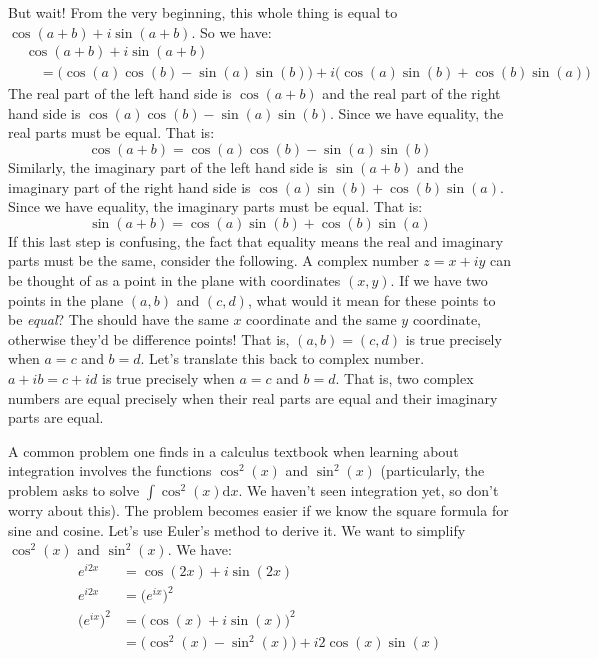 \documentclass{article}
\theoremstyle{normal}
\theoremstyle{plain}
\begin{document}
    But wait! From the very beginning, this whole thing is equal to
    $\cos(a+b)+i\sin(a+b)$. So we have:
    \begin{align}
        &\cos(a+b)+i\sin(a+b)\nonumber\\
        &\quad=\big(\cos(a)\cos(b)-\sin(a)\sin(b)\big)+
            i\big(\cos(a)\sin(b)+\cos(b)\sin(a)\big)
    \end{align}
    The real part of the left hand side is $\cos(a+b)$ and the real part of
    the right hand side is $\cos(a)\cos(b)-\sin(a)\sin(b)$. Since we have
    equality, the real parts must be equal. That is:
    \begin{equation}
        \cos(a+b)=\cos(a)\cos(b)-\sin(a)\sin(b)
    \end{equation}
    Similarly, the imaginary part of the left hand side is $\sin(a+b)$ and the
    imaginary part of the right hand side is
    $\cos(a)\sin(b)+\cos(b)\sin(a)$. Since we have equality, the imaginary
    parts must be equal. That is:
    \begin{equation}
        \sin(a+b)=\cos(a)\sin(b)+\cos(b)\sin(a)
    \end{equation}
    If this last step is confusing, the fact that equality means the real and
    imaginary parts must be the same, consider the following. A complex number
    $z=x+iy$ can be thought of as a point in the plane with coordinates
    $(x,y)$. If we have two points in the plane $(a,b)$ and $(c,d)$, what would
    it mean for these points to be \textit{equal}? The should have the same
    $x$ coordinate and the same $y$ coordinate, otherwise they'd be difference
    points! That is, $(a,b)=(c,d)$ is true precisely when $a=c$ and $b=d$.
    Let's translate this back to complex number. $a+ib=c+id$ is true precisely
    when $a=c$ and $b=d$. That is, two complex numbers are equal precisely when
    their real parts are equal and their imaginary parts are equal.
    \par\hfill\par
    A common problem one finds in a calculus textbook when learning about
    integration involves the functions $\cos^{2}(x)$ and $\sin^{2}(x)$
    (particularly, the problem asks to solve $\int\cos^{2}(x)\textrm{d}x$. We
    haven't seen integration yet, so don't worry about this). The problem
    becomes easier if we know the square formula for sine and cosine. Let's
    use Euler's method to derive it. We want to simplify $\cos^{2}(x)$ and
    $\sin^{2}(x)$. We have:
    \begin{align}
        e^{i2x}&=\cos(2x)+i\sin(2x)\tag{Euler's Formula}\\
        e^{i2x}&=\big(e^{ix}\big)^{2}\tag{Exponential Property}\\
        \big(e^{ix}\big)^{2}&=\big(\cos(x)+i\sin(x)\big)^{2}
            \tag{Euler's Formula}\\
            &=\big(\cos^{2}(x)-\sin^{2}(x)\big)+i2\cos(x)\sin(x)
    \end{align}
\end{document}
